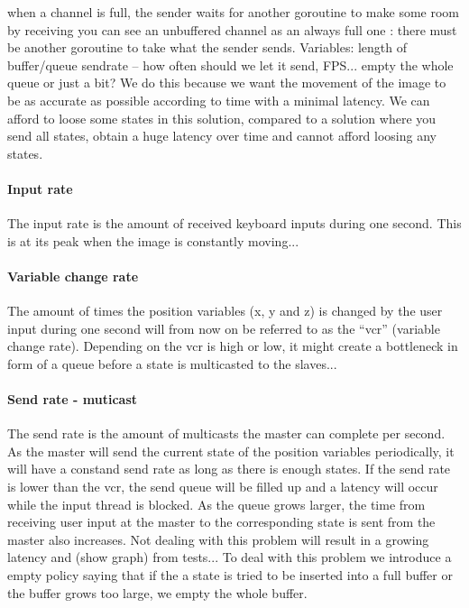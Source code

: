 \documentclass[12pt, a4paper, oneside]{article}
\begin{document}
when a channel is full, the sender waits for another goroutine to make some room by receiving
you can see an unbuffered channel as an always full one : there must be another goroutine to take what the sender sends.
\newline
\newline
Variables:
length of buffer/queue
sendrate – how often should we let it send, FPS...
empty the whole queue or just a bit?
\newline
\newline
We do this because we want the movement of the image to be as accurate as possible according to time with a minimal latency. 
We can afford to loose some states in this solution, compared to a solution where you send all states, obtain a huge latency over time and cannot afford loosing any states.

\paragraph{Input rate}
The input rate is the amount of received keyboard inputs during one second. This is at its peak when the image is constantly moving...
\paragraph{Variable change rate}
The amount of times the position variables (x, y and z) is changed by the user input during one second will from now on be referred to as the “vcr” (variable change rate).
Depending on the vcr is high or low, it might create a bottleneck in form of a queue before a state is multicasted to the slaves... 
\paragraph{Send rate - muticast}
The send rate is the amount of multicasts the master can complete per second. As the master will send the current state of the position variables periodically, it will have a constand send rate as long as there is enough states. If the send rate is lower than the vcr, the send queue will be filled up and a latency will occur while the input thread is blocked. As the queue grows larger, the time from receiving user input at the master to the corresponding state is sent from the master also increases. 
Not dealing with this problem will result in a growing latency and (show graph) from tests... 
To deal with this problem we introduce a empty policy saying that if the a state is tried to be inserted into a full buffer or the buffer grows too large, we empty the whole buffer.
\end{document}
